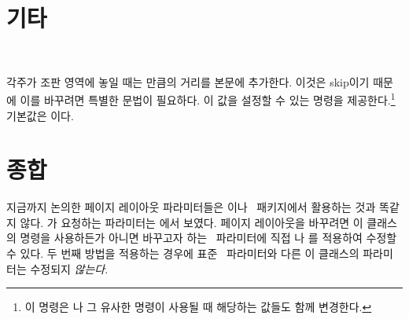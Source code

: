 

\section{기타}
\label{sec:other}


\begin{syntax}
\cmd{\setfootins} \\
\end{syntax}

\noindent
각주가 조판 영역에 놓일 때는  만큼의 거리를 본문에
추가한다. 이것은 skip이기 때문에 이를 바꾸려면 특별한 문법이 필요하다.
이 값을 설정할 수 있는 명령을 제공한다.\footnote{이 명령은 나 그 유사한 명령이 사용될 때 해당하는 값들도
함께 변경한다.}
기본값은 이다.




\section{종합}

지금까지 논의한 페이지 레이아웃 파라미터들은 \ltx 이나 \ltx\ 패키지에서
활용하는 것과 똑같지 않다. \ltx 가 요청하는 파라미터는 에서
보였다. 페이지 레이아웃을 바꾸려면 이 클래스의 명령을 사용하든가 아니면 
바꾸고자 하는 \ltx\ 
파라미터에 직접 \cmd{\setlength}나 \cmd{\addtolength}를 적용하여
수정할 수 있다. 두 번째 방법을 적용하는 경우에 표준 \ltx\ 파라미터와
다른 이 클래스의 파라미터는 수정되지 \emph{않는다}.

